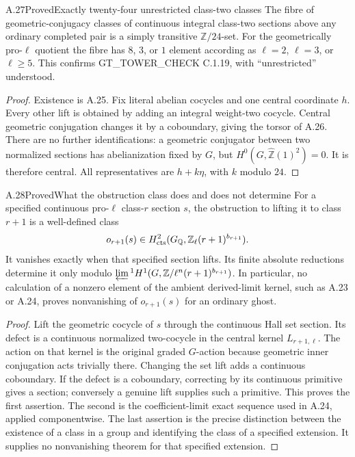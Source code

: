 \begin{result}{A.27}{Proved}{Exactly twenty-four unrestricted class-two classes}
\label{coh:24}
The fibre of geometric-conjugacy classes of continuous integral
class-two sections above any ordinary completed pair is a simply
transitive $\mathbb Z/24$-set. For the geometrically pro-$\ell$
quotient the fibre has $8$, $3$, or $1$ element according as
$\ell=2$, $\ell=3$, or $\ell\geq5$. This confirms
GT\_TOWER\_CHECK C.1.19, with ``unrestricted'' understood.
\end{result}
\begin{proof}
Existence is A.25. Fix literal abelian cocycles and one central
coordinate $h$. Every other lift is obtained by adding an integral
weight-two cocycle. Central geometric conjugation changes it by a
coboundary, giving the torsor of A.26. There are no further
identifications: a geometric conjugator between two normalized
sections has abelianization fixed by $G$, but
$H^0(G,\widehat{\mathbb Z}(1)^2)=0$. It is therefore central.
All representatives are $h+k\eta$, with $k$ modulo $24$.
\end{proof}

\begin{result}{A.28}{Proved}{What the obstruction class does and does not determine}
\label{coh:obstruction}
For a specified continuous pro-$\ell$ class-$r$ section $s$, the
obstruction to lifting it to class $r+1$ is a well-defined class
\[
 o_{r+1}(s)\in
 H^2_{\rm cts}(G_{\mathbb Q},\mathbb Z_\ell(r+1)^{b_{r+1}}).
\]
It vanishes exactly when that specified section lifts. Its finite
absolute reductions determine it only modulo
$\varprojlim{}^1H^1(G,\mathbb Z/\ell^n(r+1)^{b_{r+1}})$.
In particular, no calculation of a nonzero element of the ambient
derived-limit kernel, such as A.23 or A.24, proves nonvanishing of
$o_{r+1}(s)$ for an ordinary ghost.
\end{result}
\begin{proof}
Lift the geometric cocycle of $s$ through the continuous Hall set
section. Its defect is a continuous normalized two-cocycle in the
central kernel $L_{r+1,\ell}$. The action on that kernel is the
original graded $G$-action because geometric inner conjugation acts
trivially there. Changing the set lift adds a continuous coboundary.
If the defect is a coboundary, correcting by its continuous primitive
gives a section; conversely a genuine lift supplies such a primitive.
This proves the first assertion. The second is the coefficient-limit
exact sequence used in A.24, applied componentwise. The last assertion
is the precise distinction between the existence of a class in a group
and identifying the class of a specified extension. It supplies no
nonvanishing theorem for that specified extension.
\end{proof}


